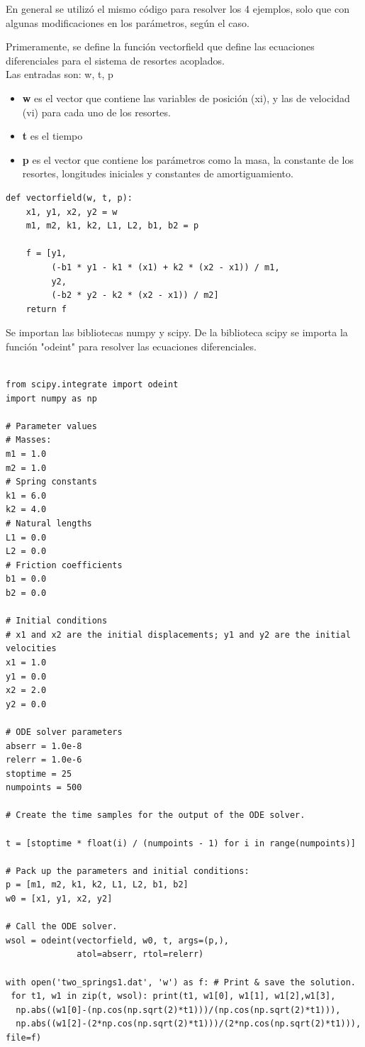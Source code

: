 \documentclass[a4paper]{article}
\begin{document}
En general se utilizó el mismo código para resolver los 4 ejemplos, solo que con algunas modificaciones en los parámetros, según el caso.

Primeramente, se define la función vectorfield que define las ecuaciones diferenciales para el sistema de resortes acoplados. \\

Las entradas son: w, t, p
\begin{itemize}

\item \textbf{w} es el vector que contiene las variables de posición (xi), y las de velocidad (vi) para cada uno de los resortes. 
\item \textbf{t} es el tiempo
\item \textbf{p} es el vector que contiene los parámetros como la masa, la constante de los resortes, longitudes iniciales y constantes de amortiguamiento.

\end{itemize}

\begin{verbatim}
def vectorfield(w, t, p):
    x1, y1, x2, y2 = w
    m1, m2, k1, k2, L1, L2, b1, b2 = p

    f = [y1,
         (-b1 * y1 - k1 * (x1) + k2 * (x2 - x1)) / m1,
         y2,
         (-b2 * y2 - k2 * (x2 - x1)) / m2]
    return f
\end{verbatim}

Se importan las bibliotecas numpy y scipy. De la biblioteca scipy se importa la función "odeint" para resolver las ecuaciones diferenciales.

\begin{verbatim}

from scipy.integrate import odeint
import numpy as np

# Parameter values
# Masses:
m1 = 1.0
m2 = 1.0
# Spring constants
k1 = 6.0
k2 = 4.0
# Natural lengths
L1 = 0.0
L2 = 0.0
# Friction coefficients
b1 = 0.0
b2 = 0.0

# Initial conditions
# x1 and x2 are the initial displacements; y1 and y2 are the initial velocities
x1 = 1.0
y1 = 0.0
x2 = 2.0
y2 = 0.0

# ODE solver parameters
abserr = 1.0e-8
relerr = 1.0e-6
stoptime = 25
numpoints = 500

# Create the time samples for the output of the ODE solver.

t = [stoptime * float(i) / (numpoints - 1) for i in range(numpoints)]

# Pack up the parameters and initial conditions:
p = [m1, m2, k1, k2, L1, L2, b1, b2]
w0 = [x1, y1, x2, y2]

# Call the ODE solver.
wsol = odeint(vectorfield, w0, t, args=(p,),
              atol=abserr, rtol=relerr)

with open('two_springs1.dat', 'w') as f: # Print & save the solution. 
 for t1, w1 in zip(t, wsol): print(t1, w1[0], w1[1], w1[2],w1[3],
  np.abs((w1[0]-(np.cos(np.sqrt(2)*t1)))/(np.cos(np.sqrt(2)*t1))), 
  np.abs((w1[2]-(2*np.cos(np.sqrt(2)*t1)))/(2*np.cos(np.sqrt(2)*t1))), file=f)
  
\end{verbatim}
\end{document}
